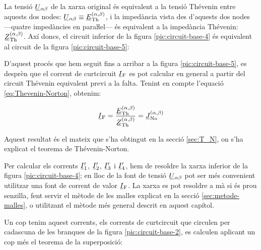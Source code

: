 \begin{center}
	
	\label{pic:circuit-base-4}
\end{center}

La tensió $\cmplx{U}_{\alpha\beta}$ de la xarxa original és equivalent a la tensió Thévenin entre aquests dos nodes: $\cmplx{U}_{\alpha\beta} \equiv \cmplx{E}\ped{Th}^{(\alpha, \beta)}$, i la impedància vista des d'aquests dos nodes ---quatre impedàncies en paraŀlel--- és equivalent a la impedància Thévenin: $\cmplx{Z}\ped{Th}^{(\alpha, \beta)}$. Axí doncs, el circuit inferior de la figura  \vref{pic:circuit-base-4} és equivalent al circuit de la figura \vref{pic:circuit-base-5}:

\begin{center}
	
	\label{pic:circuit-base-5}
\end{center}

D'aquest procés que hem seguit fins a arribar a la figura \vref{pic:circuit-base-5}, es desprèn que el corrent de curtcircuit $\cmplx{I}\ped{F}$ es pot calcular en general a partir del circuit Thévenin equivalent previ a la falta. Tenint en compte l'equació \eqref{eq:Thevenin-Norton}, obtenim:

\begin{equation}
	\cmplx{I}\ped{F} = \frac{\cmplx{E}\ped{Th}^{(\alpha, \beta)}}{\cmplx{Z}\ped{Th}^{(\alpha, \beta)}}
	= \cmplx{J}\ped{No}^{(\alpha, \beta)}
\end{equation}

Aquest resultat és el mateix que s'ha obtingut en la secció \ref{sec:T_N}, on s'ha explicat el teorema de Thévenin-Norton.

Per calcular els corrents $\cmplx{I}_1'$, $\cmplx{I}_2'$, $\cmplx{I}_3'$ i $\cmplx{I}_4'$, hem de resoldre la xarxa inferior de la figura \vref{pic:circuit-base-4}; en lloc de la font de tensió $\cmplx{U}_{\alpha\beta}$ pot ser més convenient utilitzar una font de corrent de valor $\cmplx{I}\ped{F}$. La xarxa es pot resoldre a mà si és prou senzilla, fent servir el mètode de les malles explicat en la secció \vref{sec:metode-malles}, o utilitzant el mètode més general descrit en aquest capítol.

Un cop tenim aquest corrents, els corrents de curtcircuit que circulen per cadascuna de les branques de la figura \vref{pic:circuit-base-2}, es calculen  aplicant un cop més el teorema de la superposició:

